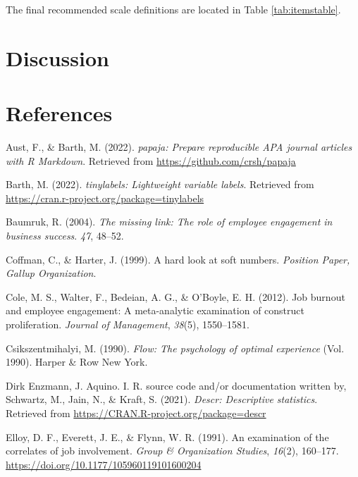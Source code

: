 \documentclass[
  man]{apa6}
\newlength{\cslhangindent}
\newlength{\cslentryspacingunit} %
\newenvironment{CSLReferences}[2] %
 {%
  \setlength{\parindent}{0pt}
  \ifodd #1
  \let\oldpar\par
  \def\par{\hangindent=\cslhangindent\oldpar}
  \fi
  \setlength{\parskip}{#2\cslentryspacingunit}
 }%
 {}
\begin{document}
The final recommended scale definitions are located in Table \ref{tab:itemstable}.

\hypertarget{discussion}{%
\section{Discussion}\label{discussion}}

\newpage

\hypertarget{references}{%
\section{References}\label{references}}

\hypertarget{refs}{}
\begin{CSLReferences}{1}{0}
\leavevmode{}%
Aust, F., \& Barth, M. (2022). \emph{{papaja}: {Prepare} reproducible {APA} journal articles with {R Markdown}}. Retrieved from \url{https://github.com/crsh/papaja}

\leavevmode{}%
Barth, M. (2022). \emph{{tinylabels}: Lightweight variable labels}. Retrieved from \url{https://cran.r-project.org/package=tinylabels}

\leavevmode{}%
Baumruk, R. (2004). \emph{The missing link: The role of employee engagement in business success}. \emph{47}, 48--52.

\leavevmode{}%
Coffman, C., \& Harter, J. (1999). A hard look at soft numbers. \emph{Position Paper, Gallup Organization}.

\leavevmode{}%
Cole, M. S., Walter, F., Bedeian, A. G., \& O'Boyle, E. H. (2012). Job burnout and employee engagement: A meta-analytic examination of construct proliferation. \emph{Journal of Management}, \emph{38}(5), 1550--1581.

\leavevmode{}%
Csikszentmihalyi, M. (1990). \emph{Flow: The psychology of optimal experience} (Vol. 1990). Harper \& Row New York.

\leavevmode{}%
Dirk Enzmann, J. Aquino. I. R. source code and/or documentation written by, Schwartz, M., Jain, N., \& Kraft, S. (2021). \emph{Descr: Descriptive statistics}. Retrieved from \url{https://CRAN.R-project.org/package=descr}

\leavevmode{}%
Elloy, D. F., Everett, J. E., \& Flynn, W. R. (1991). An examination of the correlates of job involvement. \emph{Group \& Organization Studies}, \emph{16}(2), 160--177. \url{https://doi.org/10.1177/105960119101600204}


\end{CSLReferences}
\end{document}
